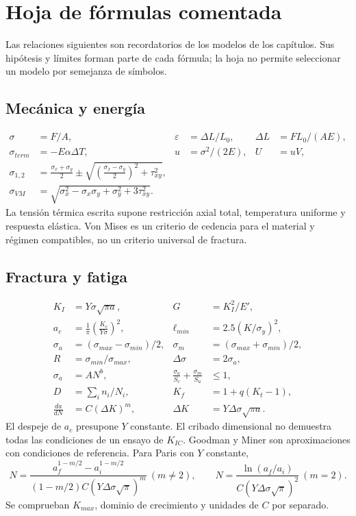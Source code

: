 \appendix
\chapter{Hoja de fórmulas comentada}\label{app:formulas}
Las relaciones siguientes son recordatorios de los modelos de los capítulos. Sus hipótesis y límites forman parte de cada fórmula; la hoja no permite seleccionar un modelo por semejanza de símbolos.
\section{Mecánica y energía}
\begin{align*}
\sigma&=F/A,&\varepsilon&=\Delta L/L_0,&\Delta L&=FL_0/(AE),\\
\sigma_{term}&=-E\alpha\Delta T,&u&=\sigma^2/(2E),&U&=uV,\\
\sigma_{1,2}&=\frac{\sigma_x+\sigma_y}{2}\pm\sqrt{\left(\frac{\sigma_x-\sigma_y}{2}\right)^2+\tau_{xy}^2},\\
\sigma_{VM}&=\sqrt{\sigma_x^2-\sigma_x\sigma_y+\sigma_y^2+3\tau_{xy}^2}.&&
\end{align*}
La tensión térmica escrita supone restricción axial total, temperatura uniforme y respuesta elástica. Von Mises es un criterio de cedencia para el material y régimen compatibles, no un criterio universal de fractura.
\section{Fractura y fatiga}
\begin{align*}
K_I&=Y\sigma\sqrt{\pi a},&G&=K_I^2/E',\\
a_c&=\frac1\pi\left(\frac{K_c}{Y\sigma}\right)^2,&\ell_{min}&=2.5(K/\sigma_y)^2,\\
\sigma_a&=(\sigma_{max}-\sigma_{min})/2,&\sigma_m&=(\sigma_{max}+\sigma_{min})/2,\\
R&=\sigma_{min}/\sigma_{max},&\Delta\sigma&=2\sigma_a,\\
\sigma_a&=AN^b,&\frac{\sigma_a}{S_e}+\frac{\sigma_m}{S_u}&\leq1,\\
D&=\sum_i n_i/N_i,&K_f&=1+q(K_t-1),\\
\frac{da}{dN}&=C(\Delta K)^m,&\Delta K&=Y\Delta\sigma\sqrt{\pi a}.
\end{align*}
El despeje de $a_c$ presupone $Y$ constante. El cribado dimensional no demuestra todas las condiciones de un ensayo de $K_{IC}$. Goodman y Miner son aproximaciones con condiciones de referencia. Para Paris con $Y$ constante,
\[N=\frac{a_f^{1-m/2}-a_i^{1-m/2}}{(1-m/2)C(Y\Delta\sigma\sqrt\pi)^m}\ (m\ne2),\qquad N=\frac{\ln(a_f/a_i)}{C(Y\Delta\sigma\sqrt\pi)^2}\ (m=2).\]
Se comprueban $K_{max}$, dominio de crecimiento y unidades de $C$ por separado.
